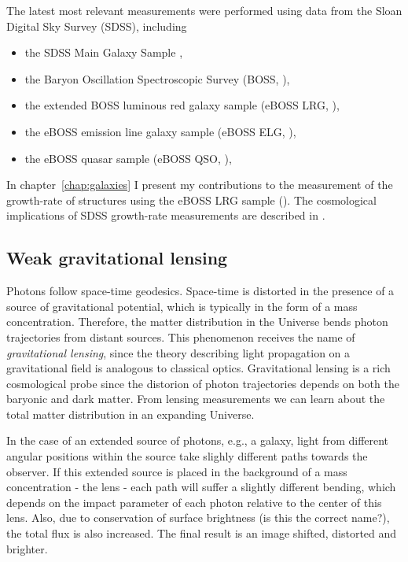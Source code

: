     The latest most relevant measurements were performed using data from 
    the Sloan Digital Sky Survey (SDSS), including 
    \begin{itemize} 
        \item the SDSS Main Galaxy Sample \cite{howlettClusteringSDSSMain2015},
        \item the Baryon Oscillation Spectroscopic Survey (BOSS, \cite{alamClusteringGalaxiesCompleted2017}), 
        \item the extended BOSS luminous red galaxy sample (eBOSS LRG, \cite{bautistaCompletedSDSSIVExtended2020, gil-marinCompletedSDSSIVExtended2020}), 
        \item the eBOSS emission line galaxy sample (eBOSS ELG, \cite{tamoneCompletedSDSSIVExtended2020, demattiaCompletedSDSSIVExtended2021}),
        \item the eBOSS quasar sample (eBOSS QSO, \cite{houCompletedSDSSIVExtended2021, neveuxCompletedSDSSIVExtended2020}),
    \end{itemize}

    In chapter~\ref{chap:galaxies} I present my contributions to the measurement 
    of the growth-rate of structures using the eBOSS LRG sample 
    (\cite{bautistaCompletedSDSSIVExtended2020}).
    The cosmological implications of SDSS growth-rate measurements are described 
    in \cite{alamCompletedSDSSIVExtended2021}. 

    \subsection{Weak gravitational lensing}
    \label{intro:probes:wl}

    Photons follow space-time geodesics. Space-time is distorted in the presence 
    of a source of gravitational potential, which is typically in the form of a mass concentration. 
    Therefore, the matter distribution in the Universe bends photon trajectories from distant sources.  
    This phenomenon receives the name of \emph{gravitational lensing}, since the 
    theory describing light propagation on a gravitational field is analogous to classical optics.  
    Gravitational lensing is a rich cosmological probe since the distorion of photon trajectories
    depends on both the baryonic and dark matter. From lensing measurements we can learn 
    about the total matter distribution in an expanding Universe. 
    
    In the case of an extended source of photons, e.g., a galaxy, light from different 
    angular positions within the source take slighly different paths towards the observer. 
    If this extended source is placed in the background of a mass concentration - the lens - each 
    path will suffer a slightly different bending, which depends on the impact parameter 
    of each photon relative to the center of this lens. 
    Also, due to conservation of surface brightness (is this the correct name?), 
    the total flux is also increased. 
    The final result is an image shifted, distorted and brighter. 

